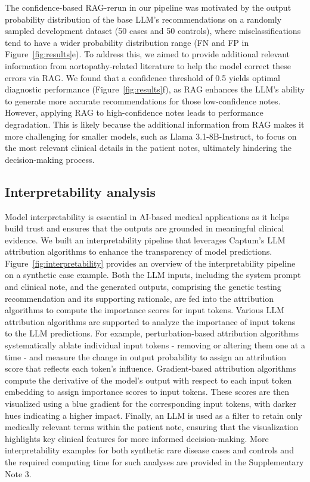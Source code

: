 \documentclass[fleqn,10pt]{wlscirep}
\begin{document}
The confidence-based RAG-rerun in our pipeline was motivated by the output probability distribution of the base LLM’s recommendations on a randomly sampled development dataset (50 cases and 50 controls), where misclassifications tend to have a wider probability distribution range (FN and FP in Figure~\ref{fig:results}e). To address this, we aimed to provide additional relevant information from aortopathy-related literature to help the model correct these errors via RAG. We found that a confidence threshold of 0.5 yields optimal diagnostic performance (Figure~\ref{fig:results}f), as RAG enhances the LLM’s ability to generate more accurate recommendations for those low-confidence notes. However, applying RAG to high-confidence notes leads to performance degradation. This is likely because the additional information from RAG makes it more challenging for smaller models, such as Llama 3.1-8B-Instruct, to focus on the most relevant clinical details in the patient notes, ultimately hindering the decision-making process. 

\subsection*{Interpretability analysis}
Model interpretability is essential in AI-based medical applications as it helps build trust and ensures that the outputs are grounded in meaningful clinical evidence. We built an interpretability pipeline that leverages Captum’s LLM attribution algorithms to enhance the transparency of model predictions.\cite{kokhlikyan2020captum} Figure~\ref{fig:interpretability} provides an overview of the interpretability pipeline on a synthetic case example. Both the LLM inputs, including the system prompt and clinical note, and the generated outputs, comprising the genetic testing recommendation and its supporting rationale, are fed into the attribution algorithms to compute the importance scores for input tokens. Various LLM attribution algorithms are supported to analyze the importance of input tokens to the LLM predictions. For example, perturbation-based attribution algorithms systematically ablate individual input tokens - removing or altering them one at a time - and measure the change in output probability to assign an attribution score that reflects each token’s influence. Gradient-based attribution algorithms compute the derivative of the model’s output with respect to each input token embedding to assign importance scores to input tokens.\cite{sundararajan2017axiomatic} These scores are then visualized using a blue gradient for the corresponding input tokens, with darker hues indicating a higher impact. Finally, an LLM is used as a filter to retain only medically relevant terms within the patient note, ensuring that the visualization highlights key clinical features for more informed decision-making. More interpretability examples for both synthetic rare disease cases and controls and the required computing time for such analyses are provided in the Supplementary Note 3.
\end{document}
